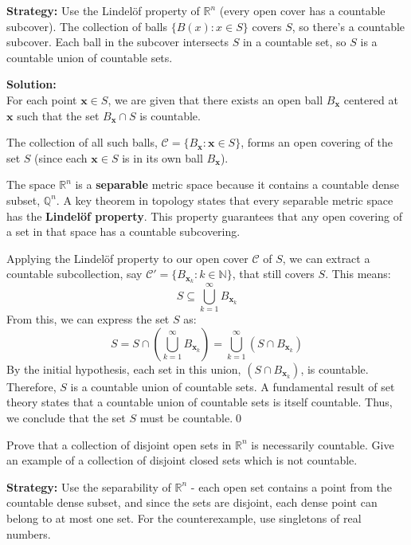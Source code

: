 \noindent\textbf{Strategy:} Use the Lindelöf property of $\mathbb{R}^n$ (every open cover has a countable subcover). The collection of balls $\{B(x) : x \in S\}$ covers $S$, so there's a countable subcover. Each ball in the subcover intersects $S$ in a countable set, so $S$ is a countable union of countable sets.

\bigskip\noindent\textbf{Solution:}\\
For each point $\mathbf{x} \in S$, we are given that there exists an open ball $B_\mathbf{x}$ centered at $\mathbf{x}$ such that the set $B_\mathbf{x} \cap S$ is countable.

The collection of all such balls, $\mathcal{C} = \{B_\mathbf{x} : \mathbf{x} \in S\}$, forms an open covering of the set $S$ (since each $\mathbf{x} \in S$ is in its own ball $B_\mathbf{x}$).

The space $\mathbb{R}^n$ is a \textbf{separable} metric space because it contains a countable dense subset, $\mathbb{Q}^n$. A key theorem in topology states that every separable metric space has the \textbf{Lindelöf property}. This property guarantees that any open covering of a set in that space has a countable subcovering.

Applying the Lindelöf property to our open cover $\mathcal{C}$ of $S$, we can extract a countable subcollection, say $\mathcal{C}' = \{B_{\mathbf{x}_k} : k \in \mathbb{N}\}$, that still covers $S$. This means:
$$S \subseteq \bigcup_{k=1}^{\infty} B_{\mathbf{x}_k}$$
From this, we can express the set $S$ as:
$$S = S \cap \left( \bigcup_{k=1}^{\infty} B_{\mathbf{x}_k} \right) = \bigcup_{k=1}^{\infty} (S \cap B_{\mathbf{x}_k})$$
By the initial hypothesis, each set in this union, $(S \cap B_{\mathbf{x}_k})$, is countable.
Therefore, $S$ is a countable union of countable sets. A fundamental result of set theory states that a countable union of countable sets is itself countable. Thus, we conclude that the set $S$ must be countable.\qed


\begin{problembox}
Prove that a collection of disjoint open sets in \( \mathbb{R}^n \) is necessarily countable. Give an example of a collection of disjoint closed sets which is not countable.
\end{problembox}

\noindent\textbf{Strategy:} Use the separability of $\mathbb{R}^n$ - each open set contains a point from the countable dense subset, and since the sets are disjoint, each dense point can belong to at most one set. For the counterexample, use singletons of real numbers.

